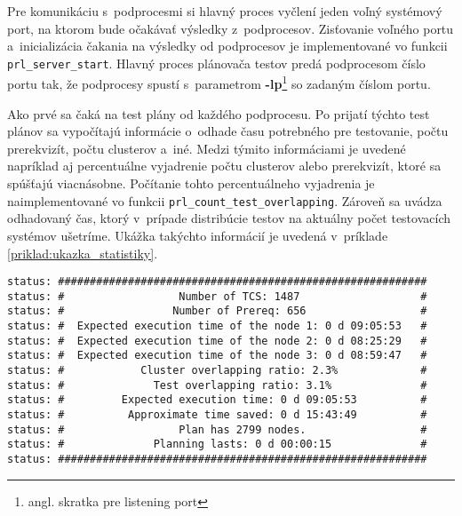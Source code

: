 Pre komunikáciu s~podprocesmi si hlavný proces vyčlení jeden voľný 
systémový port, na ktorom bude očakávať výsledky z~podprocesov. 
Zisťovanie voľného portu a~inicializácia čakania na výsledky od 
podprocesov je implementované vo funkcii \texttt{prl\_server\_start}. 
Hlavný proces plánovača testov predá podprocesom číslo portu tak, že 
podprocesy spustí s~parametrom 
\textbf{-lp}\footnote{angl. skratka pre listening port} so zadaným
číslom portu.

Ako prvé sa čaká na test plány od každého podprocesu. 
Po prijatí týchto test plánov sa vypočítajú informácie
o~odhade času potrebného pre testovanie, počtu prerekvizít, počtu clusterov a~iné.
Medzi týmito informáciami je uvedené napríklad aj percentuálne vyjadrenie 
počtu clusterov alebo prerekvizít, ktoré sa spúšťajú viacnásobne. 
Počítanie tohto percentuálneho vyjadrenia 
je naimplementované vo funkcii \texttt{prl\_count\_test\_overlapping}.
Zároveň sa uvádza odhadovaný čas, ktorý v~prípade distribúcie testov
na aktuálny počet testovacích systémov ušetríme. 
Ukážka takýchto informácií je uvedená v~príklade \ref{priklad:ukazka_statistiky}.

\begin{lstlisting}[caption=Informácie zobrazované pred spustením regresných testoch,
label=priklad:ukazka_statistiky]
status: ##########################################################
status: #                  Number of TCS: 1487                   #
status: #                 Number of Prereq: 656                  #
status: #  Expected execution time of the node 1: 0 d 09:05:53   #
status: #  Expected execution time of the node 2: 0 d 08:25:29   #
status: #  Expected execution time of the node 3: 0 d 08:59:47   #
status: #            Cluster overlapping ratio: 2.3%             #
status: #              Test overlapping ratio: 3.1%              #
status: #         Expected execution time: 0 d 09:05:53          #
status: #          Approximate time saved: 0 d 15:43:49          #
status: #                  Plan has 2799 nodes.                  #
status: #              Planning lasts: 0 d 00:00:15              #
status: ##########################################################
\end{lstlisting}


